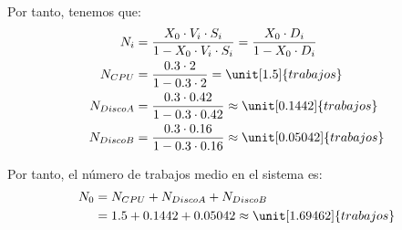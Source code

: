 \documentclass[12pt]{article}
\begin{document}
\begin{ejercicio}[2 puntos]
\begin{enumerate}
            Por tanto, tenemos que:
            \begin{align*}
                N_{i} &= \frac{X_0\cdot V_i\cdot S_i}{1 - X_0\cdot V_i\cdot S_i} = \frac{X_0\cdot D_i}{1 - X_0\cdot D_i}\\
                N_{CPU} &= \frac{0.3\cdot 2}{1 - 0.3\cdot 2} = \unit[1.5]{trabajos}\\
                N_{Disco A} &= \frac{0.3\cdot 0.42}{1 - 0.3\cdot 0.42} \approx \unit[0.1442]{trabajos}\\
                N_{Disco B} &= \frac{0.3\cdot 0.16}{1 - 0.3\cdot 0.16} \approx \unit[0.05042]{trabajos}
            \end{align*}

            Por tanto, el número de trabajos medio en el sistema es:
            \begin{align*}
                N_0 &= N_{CPU} + N_{Disco A} + N_{Disco B}\\
                &= 1.5 + 0.1442 + 0.05042 \approx \unit[1.69462]{trabajos}
            \end{align*}
        \end{enumerate}
    \end{ejercicio}
\end{document}
